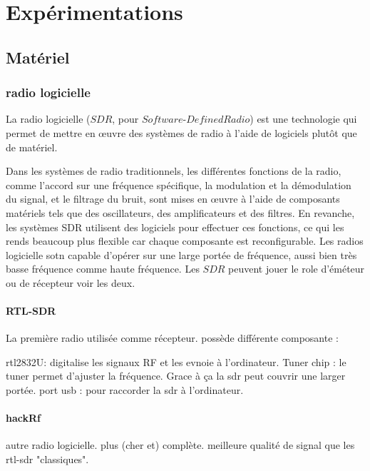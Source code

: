 \chapter{Expérimentations}


\renewcommand{\leftmark}{EXPERIMENTATIONS}

\section{Matériel}

\subsection{radio logicielle}

La radio logicielle ($SDR$, pour $Software$-$Defined Radio$) est une technologie qui permet de mettre en œuvre des systèmes de radio à l'aide de logiciels plutôt que de matériel. 

Dans les systèmes de radio traditionnels, les différentes fonctions de la radio, comme l'accord sur une fréquence spécifique, la modulation et la démodulation du signal, et le filtrage du bruit, sont mises en œuvre à l'aide de composants matériels tels que des oscillateurs, des amplificateurs et des filtres. En revanche, les systèmes SDR utilisent des logiciels pour effectuer ces fonctions, ce qui les rends beaucoup plus flexible car chaque composante est reconfigurable. Les radios logicielle sotn capable d'opérer sur une large portée de fréquence, aussi bien très basse fréquence comme haute fréquence.
Les $SDR$ peuvent jouer le role d'éméteur ou de récepteur voir les deux.

\subsubsection{RTL-SDR}

La première radio utilisée comme récepteur. possède différente composante :

rtl2832U: digitalise les signaux RF et les evnoie à l'ordinateur.
Tuner chip : le tuner permet d'ajuster la fréquence. Grace à ça la sdr peut couvrir une larger portée.
port usb : pour raccorder la sdr à l'ordinateur.

\subsubsection{hackRf}

autre radio logicielle. plus (cher et) complète. meilleure qualité de signal que les rtl-sdr "classiques".

